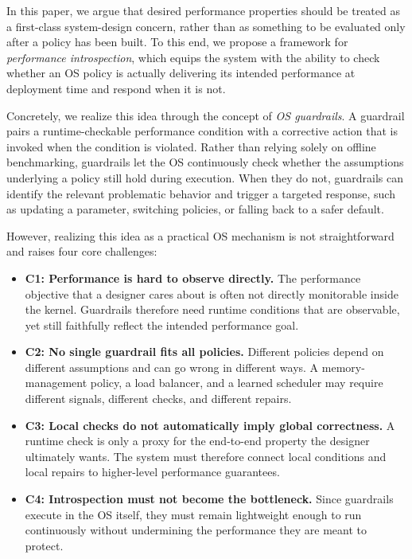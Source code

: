 In this paper, we argue that desired performance properties should be treated as a first-class system-design concern, rather than as something to be evaluated only after a policy has been built. To this end, we propose a framework for \emph{performance introspection}, which equips the system with the ability to check whether an OS policy is actually delivering its intended performance at deployment time and respond when it is not.

Concretely, we realize this idea through the concept of \emph{OS guardrails}. A guardrail pairs a runtime-checkable performance condition with a corrective action that is invoked when the condition is violated. Rather than relying solely on offline benchmarking, guardrails let the OS continuously check whether  the assumptions underlying a policy still hold during execution. When they do not, guardrails can identify the relevant problematic behavior and trigger a targeted response, such as updating a parameter, switching policies, or falling back to a safer default.

However, realizing this idea as a practical OS mechanism is not straightforward and raises four core challenges:
\begin{itemize}[leftmargin=*]
    \item \textbf{C1: Performance is hard to observe directly.} The performance objective that a designer cares about is often not directly monitorable inside the kernel. Guardrails therefore need runtime conditions that are observable, yet still faithfully reflect the intended performance goal.
    
    \item \textbf{C2: No single guardrail fits all policies.} Different policies depend on different assumptions and can go wrong in different ways. A memory-management policy, a load balancer, and a learned scheduler may require different  signals, different checks, and different repairs.
    
    \item \textbf{C3: Local checks do not automatically imply global correctness.} A runtime check is only a proxy for the end-to-end property the designer ultimately wants. The system must therefore connect local conditions and local repairs to higher-level performance guarantees.
    
    \item \textbf{C4: Introspection must not become the bottleneck.} Since guardrails execute in the OS itself, they must remain lightweight enough to run continuously without undermining the performance they are meant to protect.
\end{itemize}

